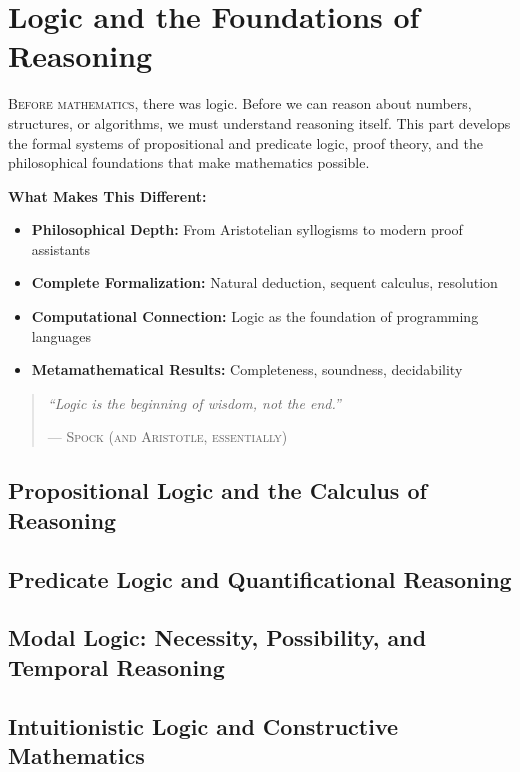 \part{Logic and the Foundations of Reasoning}
\label{part:logic-foundations}

\begin{partintro}
\lettrine[lines=3]{B}{efore mathematics}, there was logic. Before we can reason about numbers, structures, or algorithms, we must understand reasoning itself. This part develops the formal systems of propositional and predicate logic, proof theory, and the philosophical foundations that make mathematics possible.

\vspace{1em}
\textbf{What Makes This Different:}
\begin{itemize}[noitemsep]
    \item \textbf{Philosophical Depth:} From Aristotelian syllogisms to modern proof assistants
    \item \textbf{Complete Formalization:} Natural deduction, sequent calculus, resolution
    \item \textbf{Computational Connection:} Logic as the foundation of programming languages
    \item \textbf{Metamathematical Results:} Completeness, soundness, decidability
\end{itemize}

\begin{quote}
\textit{``Logic is the beginning of wisdom, not the end.''}

\hfill--- \textsc{Spock (and Aristotle, essentially)}
\end{quote}
\end{partintro}

\chapter{Propositional Logic and the Calculus of Reasoning}
\chapter{Predicate Logic and Quantificational Reasoning}
\chapter{Modal Logic: Necessity, Possibility, and Temporal Reasoning}
\chapter{Intuitionistic Logic and Constructive Mathematics}
